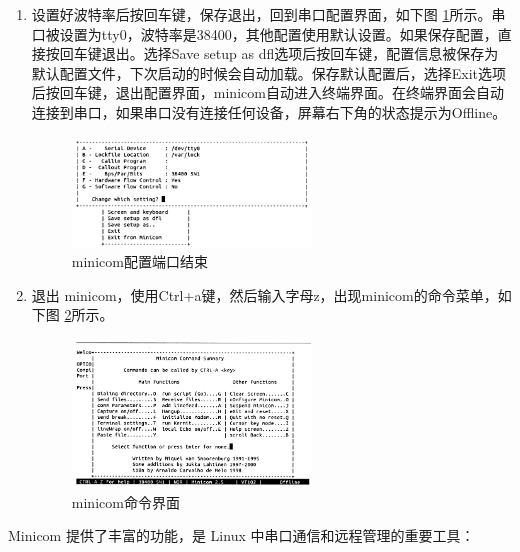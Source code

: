\begin{enumerate}
	\item 设置好波特率后按回车键，保存退出，回到串口配置界面，如下图 \ref{minicom配置端口结束}所示。串口被设置为tty0，波特率是38400，其他配置使用默认设置。如果保存配置，直接按回车键退出。选择Save setup as dfl选项后按回车键，配置信息被保存为默认配置文件，下次启动的时候会自动加载。保存默认配置后，选择Exit选项后按回车键，退出配置界面，minicom自动进入终端界面。在终端界面会自动连接到串口，如果串口没有连接任何设备，屏幕右下角的状态提示为Offline。
	\begin{figure}[h]
		\centering
		\includegraphics[width=0.6\textwidth]{figures/08-01-minicom配置端口结束.png}
		\caption{minicom配置端口结束}
		\label{minicom配置端口结束}
	\end{figure}

	\item 退出 minicom，使用Ctrl+a键，然后输入字母z，出现minicom的命令菜单，如下图 \ref{minicom命令界面}所示。
	\begin{figure}[h]
		\centering
		\includegraphics[width=0.6\textwidth]{figures/08-01-minicom命令界面.png}
		\caption{minicom命令界面}
		\label{minicom命令界面}
	\end{figure}
\end{enumerate}



Minicom 提供了丰富的功能，是 Linux 中串口通信和远程管理的重要工具：

